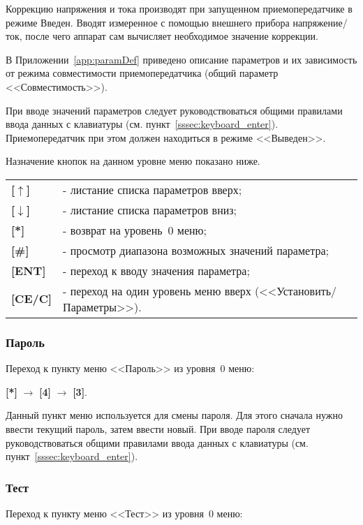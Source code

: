 Коррекцию напряжения и тока производят при запущенном приемопередатчике в режиме Введен. Вводят измеренное с помощью внешнего прибора напряжение/ток, после чего аппарат сам вычисляет необходимое значение коррекции. 

В Приложении~\ref{app:paramDef} приведено описание параметров и их зависимость от режима совместимости приемопередатчика (общий параметр <<Совместимость>>).

При вводе значений параметров следует руководствоваться общими правилами ввода данных с клавиатуры (см. пункт~\ref{sssec:keyboard_enter}). Приемопередатчик при этом должен находиться в режиме <<Выведен>>.

Назначение кнопок на данном уровне меню показано ниже.
\begin{center}
	\begin{tabular}{p{2cm} p{15cm}}
		\textbf{[$\uparrow$]}  	& - листание списка параметров вверх; \tabularnewline
		\textbf{[$\downarrow$]} & - листание списка параметров вниз; \tabularnewline
		\textbf{[*]} 			& - возврат на уровень~0 меню; \tabularnewline
		\textbf{[\#]} 			& - просмотр диапазона возможных значений параметра; \tabularnewline
		\textbf{[ENT]} 			& - переход к вводу значения параметра; \tabularnewline
		\textbf{[CE/C]} 		& - переход на один уровень меню вверх (<<Установить/Параметры>>). \tabularnewline				
	\end{tabular}
\end{center} 


\subsubsection{Пароль}	\label{sssec:password}

Переход к пункту меню <<Пароль>> из уровня~0 меню: 

\textbf{[*]} $\rightarrow$ \textbf{[4]} $\rightarrow$ \textbf{[3]}.

Данный пункт меню используется для смены пароля. Для этого сначала нужно ввести текущий пароль, затем ввести новый. При вводе пароля следует руководствоваться общими правилами ввода данных с клавиатуры (см. пункт~\ref{sssec:keyboard_enter}).


\subsubsection{Тест}	\label{sssec:test}

Переход к пункту меню <<Тест>> из уровня~0 меню: 

